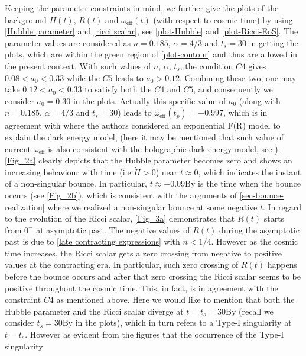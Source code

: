 \documentclass{article}
\begin{document}
 
 Keeping the parameter constraints in mind, we further give the plots of the background 
 $H(t)$, $R(t)$ and $\omega_\mathrm{eff}(t)$ (with respect to cosmic time) 
 by using \ref{Hubble parameter} and \ref{ricci scalar}, see \ref{plot-Hubble} and \ref{plot-Ricci-EoS}. 
 The parameter values are considered as $n = 0.185$, $\alpha = 4/3$ 
 and $t_s = 30$ in getting the plots, which are within the green region of \ref{plot-contour} and thus are allowed in the present context. 
 With such values of 
 $n$, $\alpha$, $t_s$, the condition $C4$ gives $0.08 < a_0 < 0.33$ while the $C5$ leads to $a_0 > 0.12$. Combining these two, one may take 
 $0.12 < a_0 < 0.33$ to satisfy both the $C4$ and $C5$, and consequently we consider $a_0 = 0.30$ in the plots. Actually this specific value of $a_0$ 
 (along with $n = 0.185$, $\alpha = 4/3$ and $t_s = 30$) leads to $\omega_\mathrm{eff}(t_p) = -0.997$, which is in agreement with \cite{Elizalde:2010ts} 
 where the authors considered an exponential F(R) model to explain the dark energy model, (here it may be mentioned that 
 such value of current $\omega_\mathrm{eff}$ is also consistent with the holographic dark energy model, see \cite{Nojiri:2021iko}). 
 \ref{Fig_2a} clearly depicts that the Hubble parameter becomes zero and shows an increasing behaviour with time (i.e $\dot{H} > 0$) near 
 $t \approx 0$, which indicates the instant of a non-singular bounce. In particular, $t \approx -0.09\mathrm{By}$ is the time when the bounce occurs 
 (see \ref{Fig_2b}), which is consistent with the arguments of \ref{sec-bounce-realization} where we realized a non-singular bounce at some negative $t$. 
 In regard to the evolution of the Ricci scalar, \ref{Fig_3a} demonstrates that $R(t)$ starts from $0^{-}$ at asymptotic past. The negative 
 values of $R(t)$ during the asymptotic past is due to \ref{late contracting expressions} with $n < 1/4$. However 
 as the cosmic time increases, the Ricci scalar gets a zero crossing from negative to positive values at the contracting era. In particular, such 
 zero crossing of $R(t)$ happens before the bounce occurs and after that zero crossing the Ricci scalar seems to be positive throughout the 
 cosmic time. This, in fact, is in agreement with the constraint $C4$ as mentioned above. Here we would like to mention that 
 both the Hubble parameter and the Ricci scalar diverge at $t = t_s = 30\mathrm{By}$ (recall we consider $t_s = 30\mathrm{By}$ in the plots), 
 which in turn refers to a Type-I singularity at $t = t_s$. However as evident from the figures that the occurrence of the Type-I singularity 
\end{document}

